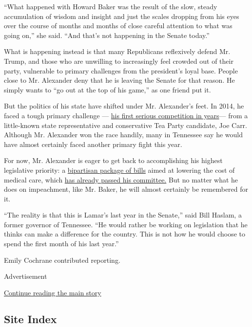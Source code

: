 ``What happened with Howard Baker was the result of the slow, steady
accumulation of wisdom and insight and just the scales dropping from his
eyes over the course of months and months of close careful attention to
what was going on,'' she said. ``And that's not happening in the Senate
today.''

What is happening instead is that many Republicans reflexively defend
Mr. Trump, and those who are unwilling to increasingly feel crowded out
of their party, vulnerable to primary challenges from the president's
loyal base. People close to Mr. Alexander deny that he is leaving the
Senate for that reason. He simply wants to ``go out at the top of his
game,'' as one friend put it.

But the politics of his state have shifted under Mr. Alexander's feet.
In 2014, he faced a tough primary challenge ---
\href{https://www.nytimes3xbfgragh.onion/2014/06/26/us/politics/tennessee-tea-party-lamar-alexander-senate-republican-primary.html}{his
first serious competition in years}--- from a little-known state
representative and conservative Tea Party candidate, Joe Carr. Although
Mr. Alexander won the race handily, many in Tennessee say he would have
almost certainly faced another primary fight this year.

For now, Mr. Alexander is eager to get back to accomplishing his highest
legislative priority: a
\href{https://www.help.senate.gov/chair/newsroom/press/bipartisan-house-and-senate-committee-leaders-announce-agreement-on-legislation-to-lower-health-care-costs-}{bipartisan
package of bills} aimed at lowering the cost of medical care, which
\href{https://www.nytimes3xbfgragh.onion/2019/06/26/us/politics/health-costs-prescription-drugs.html}{has
already passed his committee.} But no matter what he does on
impeachment, like Mr. Baker, he will almost certainly be remembered for
it.

``The reality is that this is Lamar's last year in the Senate,'' said
Bill Haslam, a former governor of Tennessee. ``He would rather be
working on legislation that he thinks can make a difference for the
country. This is not how he would choose to spend the first month of his
last year.''

Emily Cochrane contributed reporting.

Advertisement

\protect\hyperlink{after-bottom}{Continue reading the main story}

\hypertarget{site-index}{%
\subsection{Site Index}\label{site-index}}

